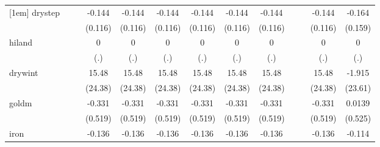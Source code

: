 {\begin{tabular}{l*{12}{c}}
[1em]
drystep     &                     &                     &      -0.144         &      -0.144         &      -0.144         &      -0.144         &      -0.144         &      -0.144         &                     &                     &      -0.144         &      -0.164         \\
            &                     &                     &     (0.116)         &     (0.116)         &     (0.116)         &     (0.116)         &     (0.116)         &     (0.116)         &                     &                     &     (0.116)         &     (0.159)         \\
[1em]
hiland      &                     &                     &           0         &           0         &           0         &           0         &           0         &           0         &                     &                     &           0         &           0         \\
            &                     &                     &         (.)         &         (.)         &         (.)         &         (.)         &         (.)         &         (.)         &                     &                     &         (.)         &         (.)         \\
[1em]
drywint     &                     &                     &       15.48         &       15.48         &       15.48         &       15.48         &       15.48         &       15.48         &                     &                     &       15.48         &      -1.915         \\
            &                     &                     &     (24.38)         &     (24.38)         &     (24.38)         &     (24.38)         &     (24.38)         &     (24.38)         &                     &                     &     (24.38)         &     (23.61)         \\
[1em]
goldm       &                     &                     &      -0.331         &      -0.331         &      -0.331         &      -0.331         &      -0.331         &      -0.331         &                     &                     &      -0.331         &      0.0139         \\
            &                     &                     &     (0.519)         &     (0.519)         &     (0.519)         &     (0.519)         &     (0.519)         &     (0.519)         &                     &                     &     (0.519)         &     (0.525)         \\
[1em]
iron        &                     &                     &      -0.136\sym{**} &      -0.136\sym{**} &      -0.136\sym{**} &      -0.136\sym{**} &      -0.136\sym{**} &      -0.136\sym{**} &                     &                     &      -0.136\sym{**} &      -0.114         \\

\end{tabular}}
